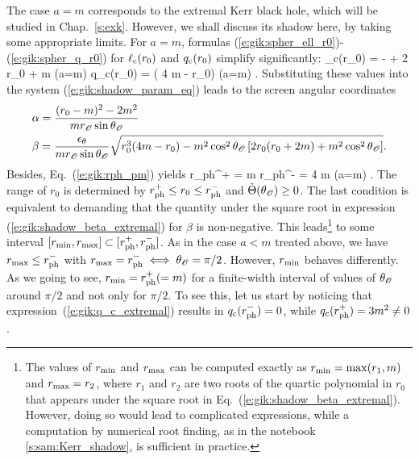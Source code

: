 The case $a=m$ corresponds to the extremal Kerr black hole, which will be
studied in Chap.~\ref{s:exk}. However, we shall discuss its
shadow here, by taking some appropriate limits.
For $a=m$, formulas (\ref{e:gik:spher_ell_r0})-(\ref{e:gik:spher_q_r0})
for $\ell_{\rm c}(r_0)$ and $q_{\rm c}(r_0)$ simplify significantly:
\be
    \ell_{\rm c}(r_0) = -  + 2 r_0 + m \qquad (a=m)
\ee
\be \label{e:gik:q_c_extremal}
    q_{\rm c}(r_0) =  ( 4 m - r_0) \qquad (a=m) .
\ee
Substituting these values into the system (\ref{e:gik:shadow_param_eq}) leads to
the screen angular coordinates
\begin{subequations}
\label{e:gik:shadow_param_extremal}
\begin{align}
& \alpha =  \frac{(r_0 - m)^2 - 2 m^2}{m r_{\mathscr{O}}\sin\theta_{\mathscr{O}}}  \label{e:gik:shadow_alpha_extremal} \\
& \beta = \frac{\epsilon_\theta}{m r_{\mathscr{O}} \sin\theta_{\mathscr{O}}}
        \sqrt{ r_0^3 (4 m - r_0) - m^2 \cos^2\theta_{\mathscr{O}} \left[ 2 r_0(r_0 + 2 m)
                + m^2\cos^2\theta_{\mathscr{O}}\right] } . \label{e:gik:shadow_beta_extremal}
\end{align}
\end{subequations}
Besides, Eq.~(\ref{e:gik:rph_pm}) yields
\be
    r_{\rm ph}^+ = m \qand r_{\rm ph}^- = 4 m \qquad (a=m) .
\ee
The range of $r_0$ is determined by $r_{\rm ph}^+ \leq r_0 \leq r_{\rm ph}^-$ and
$\tilde{\Theta}(\theta_{\mathscr{O}}) \geq 0$. The last condition is equivalent to demanding that
the quantity under the square root in expression (\ref{e:gik:shadow_beta_extremal}) for $\beta$
is non-negative. This leads\footnote{The values of $r_{\rm min}$ and $r_{\rm max}$
can be computed exactly as $r_{\rm min} = \max(r_1, m)$ and $r_{\rm max} = r_2$,
where $r_1$ and $r_2$ are two roots of the quartic polynomial in $r_0$ that appears
under the square root in Eq.~(\ref{e:gik:shadow_beta_extremal}). However, doing so would
lead to complicated expressions, while a computation by numerical root finding, as in
the notebook \ref{s:sam:Kerr_shadow}, is sufficient in practice.} to some interval $[r_{\rm min}, r_{\rm max}] \subset [r_{\rm ph}^+, r_{\rm ph}^-]$.
As in the case $a<m$ treated above, we have $r_{\rm max} \leq r_{\rm ph}^-$
with $r_{\rm max} = r_{\rm ph}^- \iff \theta_{\mathscr{O}} = \pi/2$.
However, $r_{\rm min}$ behaves differently. As we going to see,
$r_{\rm min} = r_{\rm ph}^+ (= m)$ for a finite-width interval of values of $\theta_{\mathscr{O}}$ around $\pi/2$
and not only for $\pi/2$. To see this, let us start by noticing that expression~(\ref{e:gik:q_c_extremal})
results in $q_{\rm c}(r_{\rm ph}^-) = 0$, while $q_{\rm c}(r_{\rm ph}^+) = 3 m^2 \neq 0$.
